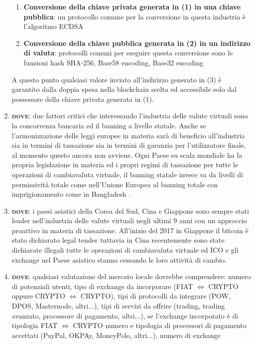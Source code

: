 \documentclass[11pt,fleqn]{book} %
\begin{document}
\begin{enumerate}
\begin{enumerate}[label*=\arabic*.]
			\item \textbf{Conversione della chiave privata generata in (1) in una chiave pubblica}: un protocollo comune per la conversione
			in questa industria è l'algoritmo ECDSA
			\item \textbf{Conversione della chiave pubblica generata in (2) in un indirizzo di valuta}: protocolli comuni per eseguire questa
			conversione sono le funzioni hash SHA-256, Base58 encoding, Base32 encoding
		\end{enumerate}
	A questo punto qualsiasi valore inviato all'indirizzo generato in (3) è garantito dalla doppia spesa nella blockchain scelta ed accessibile
	solo dal possessore della chiave privata generata in (1).
	\item \textbf{\textsc{dove}}: due fattori critici che interessando l'industria delle valute virtuali sono la concorrenza bancaria ed il 
	banning a livello statale. Anche se l'armonizzazione delle leggi europee in materia sarà di beneficio all'industria sia in termini di 
	tassazione sia in termini di garanzia per l'utilizzatore finale, al momento questo ancora non avviene. Ogni Paese su scala mondiale 
	ha la propria legislazione in materia ed i propri regimi di tassazione per tutte le operazioni di cambiavaluta virtuale,
	il banning statale invece va da livelli	di permissività totale come nell'Unione Europea al banning totale con 
	imprigionamento come in Bangladesh \cite{bitcoinLegality}. 
	\item \textbf{\textsc{dove}}: i paesi asiatici della Corea del Sud, Cina e Giappone sono sempre stati leader nell'industria delle valute virtuali
	negli ultimi 9 anni con un approccio proattivo in materia di tassazione. All'inizio del 2017 in Giappone il bitcoin è stato 
	dichiarato legal tender tuttavia in Cina recentemente sono state dichiarate illegali tutte le operazioni di cambiavaluta virtuale ed ICO 
	e gli exchange nel Paese asiatico stanno cessando le loro attività di cambio. 
	\item \textbf{\textsc{dove}}: qualsiasi valutazione del mercato locale dovrebbe comprendere: numero di potenziali utenti, tipo di exchange da 
	incorporare (FIAT $\Leftrightarrow$ CRYPTO oppure CRYPTO $\Leftrightarrow$ CRYPTO), tipi di protocolli da integrare (POW, DPOS, Masternode, altri...), 
	tipi di servizi da offrire (trading, trading avanzato, processore di pagamento, altri...), se l'exchange incorporato è di tipologia
	FIAT $\Leftrightarrow$ CRYPTO numero e tipologia di processori di pagamento accettati (PayPal, OKPAy, MoneyPolo, altri...), numero di exchange

\end{enumerate}
\end{document}
